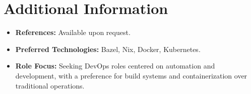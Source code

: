 \documentclass[11pt,a4paper]{article}
\begin{document}
\section{Additional Information}
\begin{itemize}[leftmargin=*]
    \item \textbf{References:} Available upon request.
    \item \textbf{Preferred Technologies:} Bazel, Nix, Docker, Kubernetes.
    \item \textbf{Role Focus:} Seeking DevOps roles centered on automation and development, with a preference for build systems and containerization over traditional operations.
\end{itemize}
\end{document}
